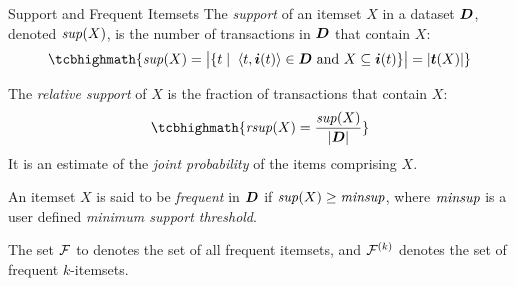\begin{frame}{Support and Frequent Itemsets}
The {\em support}
of an itemset $X$ in a dataset ${\boldsymbol D}$, denoted
$\mathit{sup}(X)$, is the number of transactions in ${\boldsymbol D}$ that
contain $X$:
\begin{align*}
\tcbhighmath{
\supp(X) = \bigl|\{ t \mid \; \tup{t,\vI(t)} \in \bD \mbox{ and
} X \subseteq \vI(t) \}\bigr| = \card{\vT(X)}
}
\end{align*}

\medskip
The {\em relative support}
of $X$ is the fraction of
transactions that contain $X$:
\begin{align*}
\tcbhighmath{
\rsupp(X) = \frac{\supp(X)}{\card{\bD}}
}
\end{align*}
It is an estimate of the {\em joint
  probability} of
the items comprising $X$.

\medskip
An itemset $X$ is said to be {\em frequent}
in ${\boldsymbol D}$ if $\mathit{sup}(X) \geq
\mathit{minsup}$, where $\mathit{minsup}$ is a user def\/{i}ned {\em minimum support
threshold}.

\medskip
The set ${\mathcal F}$ to denotes the
set of all frequent itemsets, and ${\mathcal F}^{(k)}$ denotes the set of
frequent $k$-itemsets.

\end{frame}

